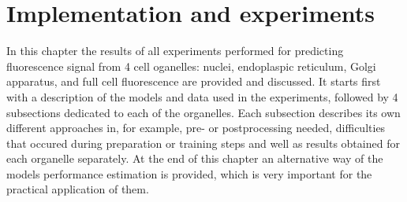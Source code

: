 \section{Implementation and experiments}
In this chapter the results of all experiments performed for predicting fluorescence signal from 4 cell oganelles: nuclei, endoplaspic reticulum, Golgi apparatus, and full cell fluorescence are provided and discussed. It starts first with a description of the models and data used in the experiments, followed by 4 subsections dedicated to each of the organelles. Each subsection describes its own different approaches in, for example, pre- or postprocessing needed, difficulties that occured during preparation or training steps and well as results obtained for each organelle separately. At the end of this chapter an alternative way of the models performance estimation is provided, which is very important for the practical application of them.

    
    \pagebreak
    
    \pagebreak
    
    \pagebreak
    
    \pagebreak
    
    \pagebreak
    